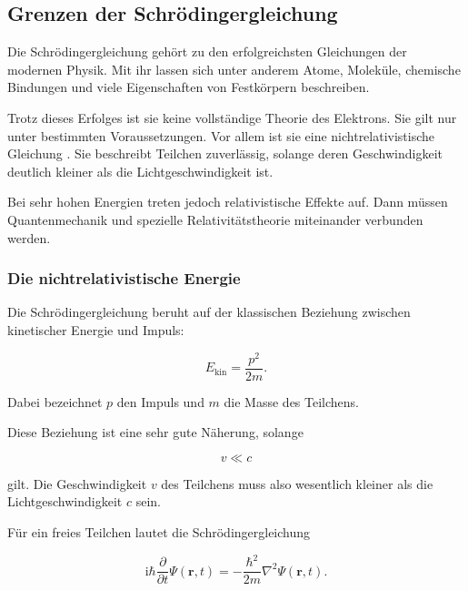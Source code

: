 
\subsection{Grenzen der Schrödingergleichung}
\label{subsec:grenzen_schroedingergleichung}

Die Schrödingergleichung%
gehört zu den erfolgreichsten Gleichungen der modernen Physik. Mit ihr
lassen sich unter anderem Atome, Moleküle, chemische Bindungen und viele
Eigenschaften von Festkörpern beschreiben.

Trotz dieses Erfolges ist sie keine vollständige Theorie des Elektrons.
Sie gilt nur unter bestimmten Voraussetzungen. Vor allem ist sie eine
nichtrelativistische Gleichung%
. Sie beschreibt Teilchen
zuverlässig, solange deren Geschwindigkeit deutlich kleiner als die
Lichtgeschwindigkeit ist.

Bei sehr hohen Energien treten jedoch relativistische Effekte auf.
Dann müssen Quantenmechanik und spezielle Relativitätstheorie%
 miteinander verbunden werden.

\subsubsection*{Die nichtrelativistische Energie}

Die Schrödingergleichung beruht auf der klassischen Beziehung zwischen
kinetischer Energie und Impuls:

\begin{equation}
	E_{\mathrm{kin}}
	=
	\frac{p^2}{2m}.
	\label{eq:klassische_energie_schroedinger_grenzen}
\end{equation}

Dabei bezeichnet \(p\) den Impuls und \(m\) die Masse des Teilchens.

Diese Beziehung ist eine sehr gute Näherung, solange

\begin{equation}
	v
	\ll
	c
\end{equation}

gilt. Die Geschwindigkeit \(v\) des Teilchens muss also wesentlich
kleiner als die Lichtgeschwindigkeit \(c\) sein.

Für ein freies Teilchen lautet die Schrödingergleichung

\begin{equation}
	\mathrm{i}\hbar
	\frac{\partial}{\partial t}
	\Psi(\mathbf{r},t)
	=
	-\frac{\hbar^2}{2m}
	\nabla^2
	\Psi(\mathbf{r},t).
	\label{eq:freie_schroedingergleichung_grenzen}
\end{equation}

